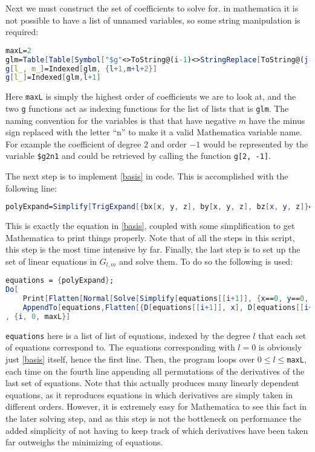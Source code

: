 \documentclass{article}
\begin{document}
Next we must construct the set of coefficients to solve for. in mathematica it is not possible to have a list of unnamed variables, so some string manipulation is required:

\begin{lstlisting}[language=mathematica]
maxL=2
glm=Table[Table[Symbol["$g"<>ToString@(i-1)<>StringReplace[ToString@(j-i-1), "-"->"n"]],{j,2i+1}],{i,maxL+1}]
g[l_, m_]=Indexed[glm, {l+1,m+l+2}]
g[l_]=Indexed[glm,l+1]
\end{lstlisting}

Here \lstinline{maxL} is simply the highest order of coefficients we are to look at, and the two \lstinline{g} functions act as indexing functions for the list of lists that is \lstinline{glm}. The naming convention for the variables is that that have negative $m$ have the minus sign replaced with the letter ``n'' to make it a valid Mathematica variable name. For example the coefficient of degree $2$ and order $-1$ would be represented by the variable \lstinline{$g2n1} and could be retrieved by calling the function \lstinline{g[2, -1]}. 

The next step is to implement \ref{basis} in code. This is accomplished with the following line: 

\begin{lstlisting}[language=Mathematica]
polyExpand=Simplify[TrigExpand[{bx[x, y, z], by[x, y, z], bz[x, y, z]}==Sum[Sum[g[l,m]*pi[l, m, x, y, z], {m, -l-1, l+1}], {l, 0, maxL}]], x^2+y^2+z^2>0]
\end{lstlisting}

This is exactly the equation in \ref{basis}, coupled with some simplification to get Mathematica to print things properly. Note that of all the steps in this script, this step is the most time intensive by far. Finally, the last step is to set up the set of linear equations in $G_{l, m}$ and solve them. To do so the following is used: 

\begin{lstlisting}[language=Mathematica]
equations = {polyExpand};
Do[
    Print[Flatten[Normal[Solve[Simplify[equations[[i+1]], {x==0, y==0, z==0}], g[i], MaxExtraConditions->Automatic]]]];
    AppendTo[equations,Flatten[{D[equations[[i+1]], x], D[equations[[i+1]], y], D[equations[[i+1]], z]}]]
, {i, 0, maxL}]
\end{lstlisting}

\lstinline{equations} here is a list of list of equations, indexed by the degree $l$ that each set of equations correspond to. The equations corresponding with $l=0$ is obviously just \ref{basis} itself, hence the first line. Then, the program loops over $0\leq l\leq$\lstinline{maxL}, each time on the fourth line appending all permutations of the derivatives of the last set of equations. Note that this actually produces many linearly dependent equations, as it reproduces equations in which derivatives are simply taken in different orders. However, it is extremely easy for Mathematica to see this fact in the later solving step, and as this step is not the bottleneck on performance the added simplicity of not having to keep track of which derivatives have been taken far outweighs the minimizing of equations. 
\end{document}
